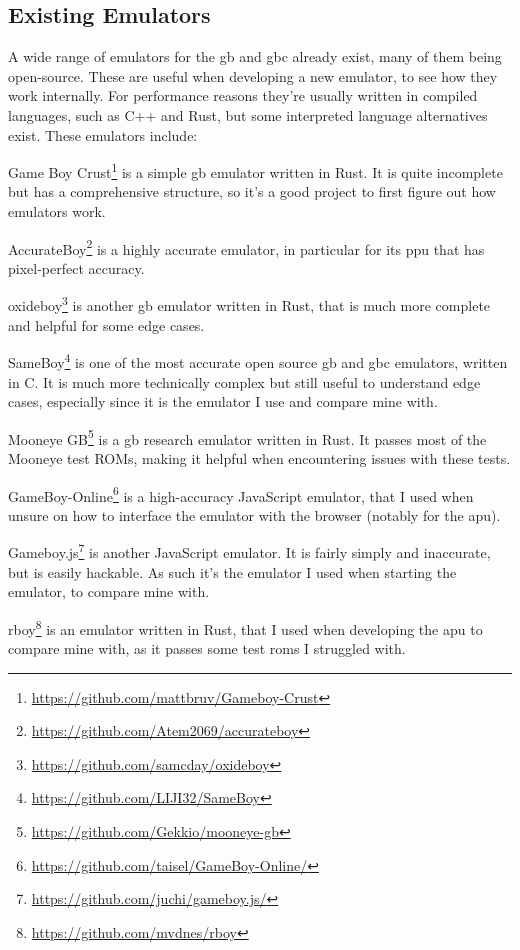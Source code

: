\documentclass[11pt]{report}
\newcommand{\ftnt}[1]{\footnote{\url{#1}}}
\begin{document}
\subsection{Existing Emulators}

A wide range of emulators for the \gls{gb} and \gls{gbc} already exist, many of them being open-source. These are useful when developing a new emulator, to see how they work internally. For performance reasons they're usually written in compiled languages, such as C++ and Rust, but some interpreted language alternatives exist. These emulators include:

\begin{compactitem}
    \item Game Boy Crust\ftnt{https://github.com/mattbruv/Gameboy-Crust} is a simple \gls{gb} emulator written in Rust. It is quite incomplete but has a comprehensive structure, so it's a good project to first figure out how emulators work.
    \item AccurateBoy\ftnt{https://github.com/Atem2069/accurateboy} is a highly accurate emulator, in particular for its \gls{ppu} that has pixel-perfect accuracy.
    \item oxideboy\ftnt{https://github.com/samcday/oxideboy} is another \gls{gb} emulator written in Rust, that is much more complete and helpful for some edge cases.
    \item SameBoy\ftnt{https://github.com/LIJI32/SameBoy} is one of the most accurate open source \gls{gb} and \gls{gbc} emulators, written in C. It is much more technically complex but still useful to understand edge cases, especially since it is the emulator I use and compare mine with.
    \item Mooneye GB\ftnt{https://github.com/Gekkio/mooneye-gb} is a \gls{gb} research emulator written in Rust. It passes most of the Mooneye test ROMs, making it helpful when encountering issues with these tests.
    \item GameBoy-Online\ftnt{https://github.com/taisel/GameBoy-Online/} is a high-accuracy JavaScript emulator, that I used when unsure on how to interface the emulator with the browser (notably for the \gls{apu}).
    \item Gameboy.js\ftnt{https://github.com/juchi/gameboy.js/} is another JavaScript emulator. It is fairly simply and inaccurate, but is easily hackable. As such it's the emulator I used when starting the emulator, to compare mine with.
    \item rboy\ftnt{https://github.com/mvdnes/rboy} is an emulator written in Rust, that I used when developing the \gls{apu} to compare mine with, as it passes some test \glspl{rom} I struggled with.
\end{compactitem}
\end{document}
